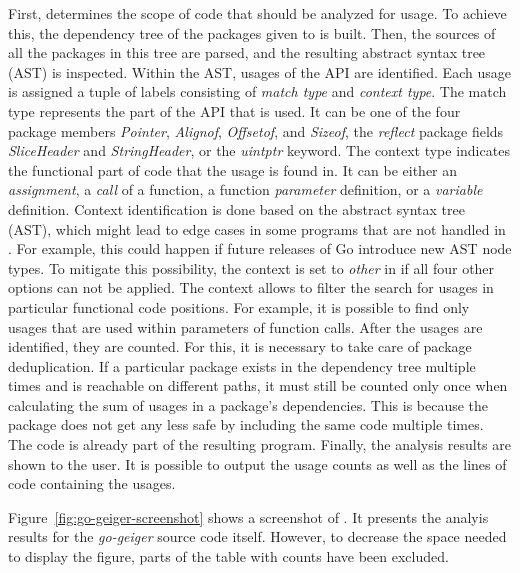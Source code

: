 First, \toolGeiger{} determines the scope of code that should be analyzed for \unsafe{} usage.
To achieve this, the dependency tree of the packages given to \toolGeiger{} is built.
Then, the sources of all the packages in this tree are parsed, and the resulting abstract syntax tree (\acrshort{AST})
is inspected.
Within the \acrshort{AST}, usages of the \unsafe{} \acrshort{API} are identified.
Each usage is assigned a tuple of labels consisting of \textit{match type} and \textit{context type}.
The match type represents the part of the \unsafe{} \acrshort{API} that is used.
It can be one of the four \unsafe{} package members \textit{Pointer}, \textit{Alignof}, \textit{Offsetof}, and
\textit{Sizeof}, the \textit{reflect} package fields \textit{SliceHeader} and \textit{StringHeader}, or the
\textit{uintptr} keyword.
The context type indicates the functional part of code that the usage is found in.
It can be either an \textit{assignment}, a \textit{call} of a function, a function \textit{parameter} definition, or a
\textit{variable} definition.
Context identification is done based on the abstract syntax tree (\acrshort{AST}), which might lead to edge cases in
some programs that are not handled in \toolGeiger{}.
For example, this could happen if future releases of Go introduce new \acrshort{AST} node types.
To mitigate this possibility, the context is set to \textit{other} in \toolGeiger{} if all four other options can not be
applied.
The context allows to filter the search for \unsafe{} usages in particular functional code positions.
For example, it is possible to find only \unsafe{} usages that are used within parameters of function calls.
After the \unsafe{} usages are identified, they are counted.
For this, it is necessary to take care of package deduplication.
If a particular package exists in the dependency tree multiple times and is reachable on different paths, it must still
be counted only once when calculating the sum of \unsafe{} usages in a package's dependencies.
This is because the package does not get any less safe by including the same code multiple times.
The code is already part of the resulting program.
Finally, the analysis results are shown to the user.
It is possible to output the \unsafe{} usage counts as well as the lines of code containing the usages.

Figure~\ref{fig:go-geiger-screenshot} shows a screenshot of \toolGeiger{}.
It presents the analyis results for the \textit{go-geiger} source code itself.
However, to decrease the space needed to display the figure, parts of the table with \unsafe{} counts have been
excluded.

